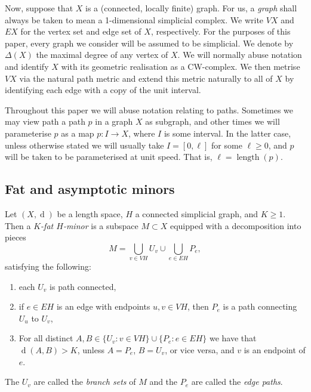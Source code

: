 \documentclass[10pt,a4paper]{amsart}
\DeclareMathOperator{\length}{length}
\DeclareMathOperator{\dist}{d}
\theoremstyle{definition}
\begin{document}
Now, suppose that $X$ is a (connected, locally finite) graph. For us, a \textit{graph} shall always be taken to mean a 1-dimensional simplicial complex. We write $VX$ and $EX$ for the vertex set and edge set of $X$, respectively.  For the purposes of this paper, every graph we consider will be assumed to be simplicial. We denote by $\Delta(X)$ the maximal degree of any vertex of $X$. We will normally abuse notation and identify $X$ with its geometric realisation as a CW-complex. We then metrise $VX$ via the natural path metric and extend this metric naturally to all of $X$ by identifying each edge with a copy of the unit interval. 

Throughout this paper we will abuse notation relating to paths. Sometimes we may view path a path $p$ in a graph $X$ as subgraph, and other times we will parameterise $p$ as a map $p : I \to X$, where $I$ is some interval. In the latter case, unless otherwise stated we will usually take $I = [0, \ell]$ for some $\ell \geq 0$, and $p$ will be taken to be parameterised at unit speed. That is, $\ell = \length(p)$. 






\subsection{Fat and asymptotic minors}\label{sec:fat-minors}

Let $(X,\dist)$ be a length space, $H$ a connected simplicial graph, and $K \geq 1$. Then a \textit{$K$-fat $H$-minor} is a subspace $M \subset X$ equipped with a decomposition into pieces
$$
M =  \bigcup_{v \in VH} U_v \cup \bigcup_{e \in EH} P_e,
$$
satisfying the following:
\begin{enumerate}
    \item each $U_v$ is path connected, 

    \item if $e \in EH$ is an edge with endpoints $u, v \in VH$, then $P_e$ is a path connecting $U_u$ to $U_v$, 

    \item For all distinct $A, B \in \{U_v : v \in VH\} \cup \{P_e : e \in EH\}$ we have that $\dist(A, B) > K$, unless $A = P_e$, $B= U_v$, or vice versa, and $v$ is an endpoint of $e$.

\end{enumerate}
The $U_v$ are called the \textit{branch sets} of $M$ and the $P_e$ are called the \textit{edge paths}.
\end{document}

